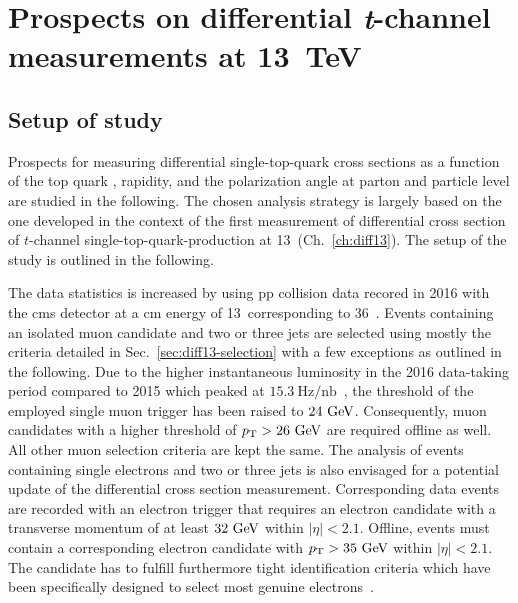 \chapter{Prospects on differential \textsl{t}-channel measurements at 13~TeV}
\label{ch:prospects}



\section{Setup of study}

Prospects for measuring differential single-top-quark cross sections as a function of the top quark \pt, rapidity, and the polarization angle at parton and particle level are studied in the following. The chosen analysis strategy is largely based on the one developed in the context of the first measurement of differential cross section of $t$-channel single-top-quark-production at 13~\TeV (Ch.~\ref{ch:diff13}). The setup of the study is outlined in the following.

The data statistics is increased by using \gls{pp} collision data recored in 2016 with the \gls{cms} detector at a \acrlong{cm} energy of 13~\TeV corresponding to 36~\invfb. Events containing an isolated muon candidate and two or three jets are selected using mostly the criteria detailed in Sec.~\ref{sec:diff13-selection} with a few exceptions as outlined in the following. Due to the higher instantaneous luminosity in the 2016 data-taking period compared to 2015 which peaked at $15.3~\mathrm{Hz}/\mathrm{nb}$~\cite{lumipublic}, the threshold of the employed single muon trigger has been raised to $24~\textrm{GeV}$. Consequently, muon candidates with a higher threshold of $p_\textrm{T}>26~\textrm{GeV}$ are required offline as well. All other muon selection criteria are kept the same. The analysis of events containing single electrons and two or three jets is also envisaged for a potential update of the differential cross section measurement. Corresponding data events are recorded with an electron trigger that requires an electron candidate with a transverse momentum of at least $32~\textrm{GeV}$ within $|\eta|<2.1$. Offline, events must contain a corresponding electron candidate with $p_\textrm{T}>35~\textrm{GeV}$ within $|\eta|<2.1$. The candidate has to fulfill furthermore tight identification criteria which have been specifically designed to select most genuine electrons~\cite{CMS-DP-2017-004}.

